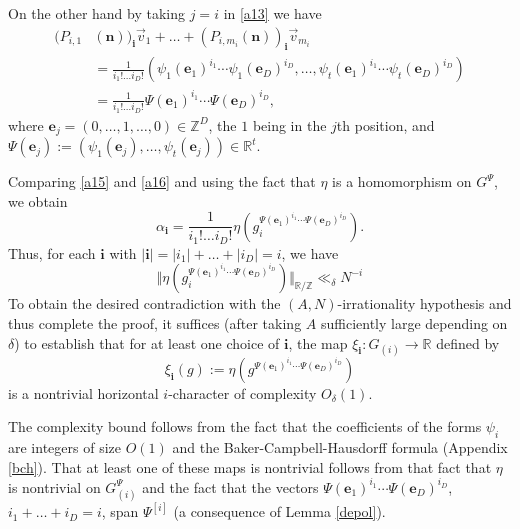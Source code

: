 \documentclass[11pt,reqno]{amsart}
\numberwithin{equation}{section}
\theoremstyle{plain}
\theoremstyle{definition}
\newcommand\Z{\mathbb{Z}}
\newcommand\R{\mathbb{R}}
\newcommand\1{{\bf 1}}
\newcommand\2{{\bf 2}}
\begin{document}
On the other hand by taking $j = i$ in \eqref{a13} we have
\begin{align}\nonumber  (P_{i,1} & (\mathbf{n}))_{\mathbf{i}} \vec{v}_1 + \dots + (P_{i,m_i}  (\mathbf{n}))_{\mathbf{i}}\vec{v}_{m_i} \\  \nonumber & = \frac{1}{i_1! \dots i_D!}(\psi_1(\mathbf{e}_1)^{i_1}\cdots \psi_1(\mathbf{e}_D)^{i_D}, \dots, \psi_t(\mathbf{e}_1)^{i_1} \cdots \psi_t(\mathbf{e}_D)^{i_D})\\ & = \frac{1}{i_1! \dots i_D!} \Psi(\mathbf{e}_1)^{i_1} \cdots \Psi(\mathbf{e}_D)^{i_D},\label{a16}\end{align} where $\textbf{e}_j = (0,\dots, 1, \dots,0) \in \Z^D$, the $1$ being in the $j$th position, and $\Psi({\mathbf e}_j) := (\psi_1({\mathbf e}_j), \ldots, \psi_t({\mathbf e}_j)) \in \R^t$.  

Comparing \eqref{a15} and \eqref{a16} and using the fact that $\eta$ is a homomorphism on $G^{\Psi}$, we obtain
\[ \alpha_{\mathbf{i}} = \frac{1}{i_1! \dots i_D!} \eta(g_i^{\Psi(\mathbf{e}_1)^{i_1} \cdots \Psi(\mathbf{e}_D)^{i_D}}).\]
Thus, for each $\mathbf{i}$ with $|\mathbf{i}| = |i_1| + \dots + |i_D| = i$, we have
\begin{equation}\label{smoothness} \Vert \eta(g_i^{\Psi(\mathbf{e}_1)^{i_1} \cdots \Psi(\mathbf{e}_D)^{i_D}}) \Vert_{\R/\Z} \ll_\delta N^{-i}\end{equation}
To obtain the desired contradiction with the $(A,N)$-irrationality hypothesis and thus complete the proof, it suffices (after taking $A$ sufficiently large depending on $\delta$) to establish that for at least one choice of $\mathbf{i}$, the map $\xi_{\mathbf{i}}: G_{(i)} \to \R$ defined by
\[ \xi_{\mathbf{i}}(g) := \eta(g^{\Psi(\mathbf{e}_1)^{i_1} \cdots \Psi(\mathbf{e}_D)^{i_D}})\] is a nontrivial horizontal $i$-character of complexity $O_\delta(1)$.

The complexity bound follows from the fact that the coefficients of the forms $\psi_i$ are integers of size $O(1)$ and the Baker-Campbell-Hausdorff formula (Appendix \ref{bch}). That at least one of these maps is nontrivial follows from that fact that $\eta$ is nontrivial on $G^{\Psi}_{(i)}$ and the fact that the vectors $\Psi(\mathbf{e}_1)^{i_1} \cdots \Psi(\mathbf{e}_D)^{i_D}$, $i_1 + \dots + i_D = i$, span $\Psi^{[i]}$ (a consequence of Lemma \ref{depol}).
\end{document}
